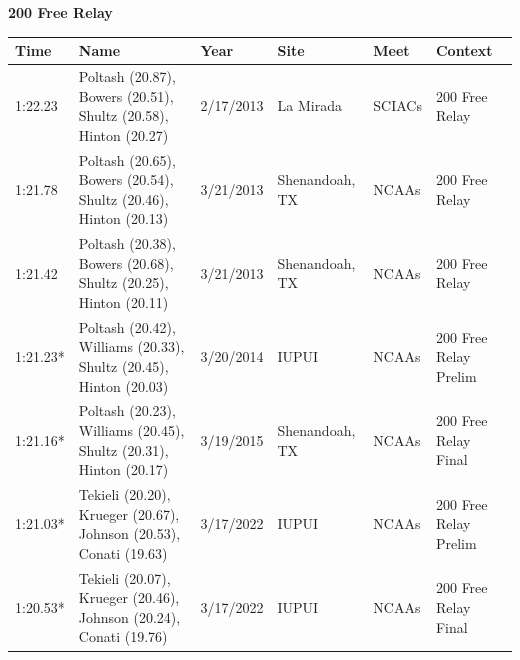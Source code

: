 

\begin{table}[H]
\centering
\begin{minipage}[t]{0.6\textwidth}
\centering
\textbf{200 Free Relay}\\[0.1cm]
\begin{tabular}{@{}p{1.8cm}p{2.8cm}p{1.2cm}p{1.4cm}p{1.4cm}p{2.0cm}@{}}
\hline
    \textbf{Time} & \textbf{Name} & \textbf{Year} & \textbf{Site} & \textbf{Meet} & \textbf{Context} \\
\hline
    1:22.23 & Poltash (20.87), Bowers (20.51), Shultz (20.58), Hinton (20.27) & 2/17/2013 & La Mirada & SCIACs & 200 Free Relay \\
    1:21.78 & Poltash (20.65), Bowers (20.54), Shultz (20.46), Hinton (20.13) & 3/21/2013 & Shenandoah, TX & NCAAs & 200 Free Relay \\
    1:21.42 & Poltash (20.38), Bowers (20.68), Shultz (20.25), Hinton (20.11) & 3/21/2013 & Shenandoah, TX & NCAAs & 200 Free Relay \\
    1:21.23* & Poltash (20.42), Williams (20.33), Shultz (20.45), Hinton (20.03) & 3/20/2014 & IUPUI & NCAAs & 200 Free Relay Prelim \\
    1:21.16* & Poltash (20.23), Williams (20.45), Shultz (20.31), Hinton (20.17) & 3/19/2015 & Shenandoah, TX & NCAAs & 200 Free Relay Final \\
    1:21.03* & Tekieli (20.20), Krueger (20.67), Johnson (20.53), Conati (19.63) & 3/17/2022 & IUPUI & NCAAs & 200 Free Relay Prelim \\
    1:20.53* & Tekieli (20.07), Krueger (20.46), Johnson (20.24), Conati (19.76) & 3/17/2022 & IUPUI & NCAAs & 200 Free Relay Final \\
\hline
\end{tabular}
\end{minipage}
\end{table}


